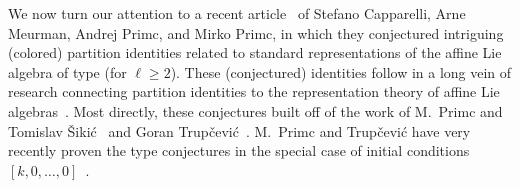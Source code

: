 \documentclass[pdftex]{sigma}
\numberwithin{equation}{section}
\theoremstyle{definition}
\begin{document}
We now turn our attention to a recent article~\cite{CMPP} of Stefano Capparelli, Arne Meurman, Andrej Primc, and Mirko Primc, in which they conjectured intriguing (colored) partition identi\-ties related to standard representations of the affine Lie algebra of type  (for $\ell\ge 2$). These (conjectured) identities follow in a long vein of research connecting partition identities to the representation theory of affine Lie algebras~\cite{Capp,KanRus-idf,KanRus-stair,LepWil-struI,MP87,MP,Nan-thesis,TakTsu-nandi}. Most directly, these conjectures built off of the work of M.~Primc and Tomislav \v{S}iki\'{c}~\cite{PS2,PS1} and Goran Trup\v{c}evi\'{c}~\cite{Tru}. M.~Primc and Trup\v{c}evi\'{c} have very recently proven the type  conjectures in the special case of initial conditions $[k,0,\dots,0]$~\cite{PT}.
\end{document}
